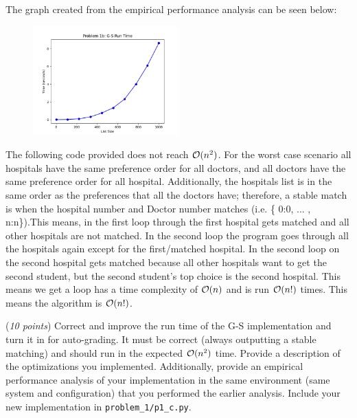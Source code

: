 \documentclass{hw}
\begin{document}
\begin{problem}
\begin{solution}
        The graph created from the empirical performance analysis can be seen below:
            \begin{figure}[h]
                \centering
                    \includegraphics[width=0.5\textwidth]{figures/problem-1b.png}
            \end{figure}

        The following code provided does not reach $\mathcal{O}(n^2)$. For the worst case scenario all hospitals have the same preference order for all doctors, and all doctors have the same preference order for all hospital. Additionally, the hospitals list is in the same order as the preferences that all the doctors have; therefore, a stable match is when the hospital number and Doctor number matches (i.e. \{ 0:0, ... , n:n\}).This means, in the first loop through the first hospital gets matched and all other hospitals are not matched. In the second loop the program goes through all the hospitals again except for the first/matched hospital. In the second loop on the second hospital gets matched because all other hospitals want to get the second student, but the second student's top choice is the second hospital. This means we get a loop has a time complexity of $\mathcal{O}(n)$ and is run $\mathcal{O}(n!)$ times. This means the algorithm is $\mathcal{O}(n!)$.  
    \end{solution}

    \begin{subproblem}
        \newcommand{\worstrank}{{\tt wr}}
        (\textit{10 points})
        Correct and improve the run time of the G-S implementation and turn it in for
          auto-grading. It must be correct (always outputting a stable matching) and should run in the expected $\mathcal{O}(n^2)$ time. 
          Provide a description of the optimizations you implemented.
          Additionally, provide an empirical performance analysis of your
          implementation in the same environment (same system and configuration) that
          you performed the earlier analysis. Include your new implementation in \texttt{problem\_1/p1\_c.py}.
    \end{subproblem}


\end{problem}
\end{document}

